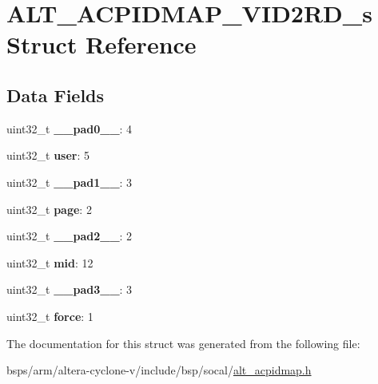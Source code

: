\hypertarget{structALT__ACPIDMAP__VID2RD__s}{}\section{A\+L\+T\+\_\+\+A\+C\+P\+I\+D\+M\+A\+P\+\_\+\+V\+I\+D2\+R\+D\+\_\+s Struct Reference}
\label{structALT__ACPIDMAP__VID2RD__s}
\subsection*{Data Fields}
\begin{DoxyCompactItemize}
\item 
\mbox{\label{structALT__ACPIDMAP__VID2RD__s_ae1e8ed9685ac248c3705378d5d28c746}} 
uint32\+\_\+t {\bfseries \+\_\+\+\_\+pad0\+\_\+\+\_\+}\+: 4
\item 
\mbox{\label{structALT__ACPIDMAP__VID2RD__s_ae0ed43c6c451ba1a4e5cbb4c60f71457}} 
uint32\+\_\+t {\bfseries user}\+: 5
\item 
\mbox{\label{structALT__ACPIDMAP__VID2RD__s_a96166cf4f0d8afdd5cbdd8f4779a733c}} 
uint32\+\_\+t {\bfseries \+\_\+\+\_\+pad1\+\_\+\+\_\+}\+: 3
\item 
\mbox{\label{structALT__ACPIDMAP__VID2RD__s_a82d84d1155137ced8f5cc5d3582bf24b}} 
uint32\+\_\+t {\bfseries page}\+: 2
\item 
\mbox{\label{structALT__ACPIDMAP__VID2RD__s_afdd08c56cf297cb8166de4e1b033e4c6}} 
uint32\+\_\+t {\bfseries \+\_\+\+\_\+pad2\+\_\+\+\_\+}\+: 2
\item 
\mbox{\label{structALT__ACPIDMAP__VID2RD__s_add1bd215bbe9f3d64bbbc070a9f0b6e3}} 
uint32\+\_\+t {\bfseries mid}\+: 12
\item 
\mbox{\label{structALT__ACPIDMAP__VID2RD__s_aa4f1b78bfae8a136c8cdadb1622ec2f7}} 
uint32\+\_\+t {\bfseries \+\_\+\+\_\+pad3\+\_\+\+\_\+}\+: 3
\item 
\mbox{\label{structALT__ACPIDMAP__VID2RD__s_a5387412b61b51c7cb10446a4ce64162f}} 
uint32\+\_\+t {\bfseries force}\+: 1
\end{DoxyCompactItemize}


The documentation for this struct was generated from the following file\+:\begin{DoxyCompactItemize}
\item 
bsps/arm/altera-\/cyclone-\/v/include/bsp/socal/\mbox{\hyperlink{alt__acpidmap_8h}{alt\+\_\+acpidmap.\+h}}\end{DoxyCompactItemize}
